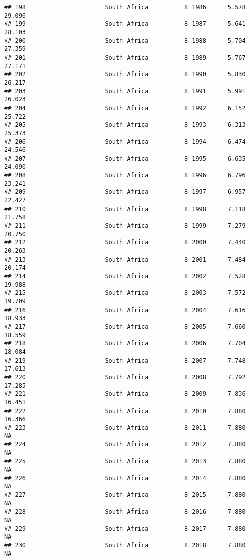 \documentclass[
]{article}
\begin{document}
\begin{verbatim}
## 198                      South Africa          8 1986      5.578     29.096
## 199                      South Africa          8 1987      5.641     28.103
## 200                      South Africa          8 1988      5.704     27.359
## 201                      South Africa          8 1989      5.767     27.171
## 202                      South Africa          8 1990      5.830     26.217
## 203                      South Africa          8 1991      5.991     26.023
## 204                      South Africa          8 1992      6.152     25.722
## 205                      South Africa          8 1993      6.313     25.373
## 206                      South Africa          8 1994      6.474     24.546
## 207                      South Africa          8 1995      6.635     24.090
## 208                      South Africa          8 1996      6.796     23.241
## 209                      South Africa          8 1997      6.957     22.427
## 210                      South Africa          8 1998      7.118     21.758
## 211                      South Africa          8 1999      7.279     20.750
## 212                      South Africa          8 2000      7.440     20.263
## 213                      South Africa          8 2001      7.484     20.174
## 214                      South Africa          8 2002      7.528     19.988
## 215                      South Africa          8 2003      7.572     19.709
## 216                      South Africa          8 2004      7.616     18.933
## 217                      South Africa          8 2005      7.660     18.559
## 218                      South Africa          8 2006      7.704     18.084
## 219                      South Africa          8 2007      7.748     17.613
## 220                      South Africa          8 2008      7.792     17.285
## 221                      South Africa          8 2009      7.836     16.451
## 222                      South Africa          8 2010      7.880     16.366
## 223                      South Africa          8 2011      7.880         NA
## 224                      South Africa          8 2012      7.880         NA
## 225                      South Africa          8 2013      7.880         NA
## 226                      South Africa          8 2014      7.880         NA
## 227                      South Africa          8 2015      7.880         NA
## 228                      South Africa          8 2016      7.880         NA
## 229                      South Africa          8 2017      7.880         NA
## 230                      South Africa          8 2018      7.880         NA

\end{verbatim}
\end{document}
